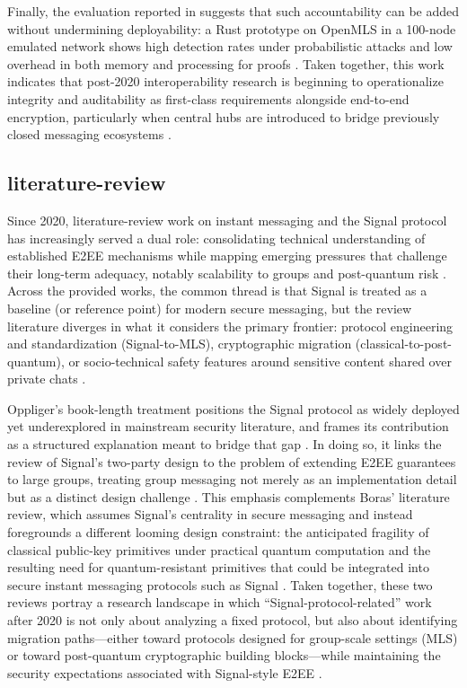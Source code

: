 Finally, the evaluation reported in \cite{sarvaiya2025} suggests that such accountability can be added without undermining deployability: a Rust prototype on OpenMLS in a 100-node emulated network shows high detection rates under probabilistic attacks and low overhead in both memory and processing for proofs \cite{sarvaiya2025}. Taken together, this work indicates that post-2020 interoperability research is beginning to operationalize integrity and auditability as first-class requirements alongside end-to-end encryption, particularly when central hubs are introduced to bridge previously closed messaging ecosystems \cite{sarvaiya2025}.

\subsection{literature-review}
Since 2020, literature-review work on instant messaging and the Signal protocol has increasingly served a dual role: consolidating technical understanding of established E2EE mechanisms while mapping emerging pressures that challenge their long-term adequacy, notably scalability to groups and post-quantum risk \cite{oppliger2024,boras2025}. Across the provided works, the common thread is that Signal is treated as a baseline (or reference point) for modern secure messaging, but the review literature diverges in what it considers the primary frontier: protocol engineering and standardization (Signal-to-MLS), cryptographic migration (classical-to-post-quantum), or socio-technical safety features around sensitive content shared over private chats \cite{oppliger2024,boras2025,samper2025}.

Oppliger’s book-length treatment positions the Signal protocol as widely deployed yet underexplored in mainstream security literature, and frames its contribution as a structured explanation meant to bridge that gap \cite{oppliger2024}. In doing so, it links the review of Signal’s two-party design to the problem of extending E2EE guarantees to large groups, treating group messaging not merely as an implementation detail but as a distinct design challenge \cite{oppliger2024}. This emphasis complements Boras’ literature review, which assumes Signal’s centrality in secure messaging and instead foregrounds a different looming design constraint: the anticipated fragility of classical public-key primitives under practical quantum computation and the resulting need for quantum-resistant primitives that could be integrated into secure instant messaging protocols such as Signal \cite{boras2025}. Taken together, these two reviews portray a research landscape in which “Signal-protocol-related” work after 2020 is not only about analyzing a fixed protocol, but also about identifying migration paths—either toward protocols designed for group-scale settings (MLS) or toward post-quantum cryptographic building blocks—while maintaining the security expectations associated with Signal-style E2EE \cite{oppliger2024,boras2025}.

